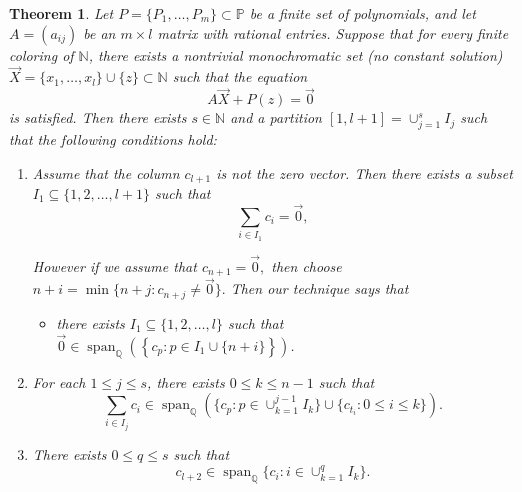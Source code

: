 \documentclass{article}
\theoremstyle{Theorem}
\newtheorem{thm}{Theorem}[section]
\theoremstyle{definition}
\begin{document}
\begin{thm}\label{N2}
Let \( P = \{P_1, \ldots, P_m\} \subset \mathbb{P} \) be a finite set of polynomials, and let \( A = (a_{ij}) \) be an \( m \times l \) matrix with rational entries. Suppose that for every finite coloring of \( \mathbb{N} \), there exists a nontrivial monochromatic set (no constant solution) \( \vec{X} = \{x_1, \ldots, x_l\} \cup \{z\} \subset \mathbb{N} \) such that the equation
\[
A\vec{X} + P(z) = \vec{0}
\]
is satisfied. Then there exists \( s \in \mathbb{N} \) and a partition $[1,l+1]=\cup_{j=1}^{s}I_j$
 such that the following conditions hold:



\begin{enumerate}
\item Assume that the column \( c_{l+1} \) is not the zero vector. Then there exists a subset \( I_1 \subseteq \{1, 2, \ldots, l+1\} \) such that
\[
\sum_{i \in I_1} c_i = \vec{0},
\]




However if we assume that $c_{n+1}=\vec 0,$ then choose $n+i=\min\{n+j:c_{n+j}\neq \vec 0\}.$ Then our technique says that 

\begin{itemize}
    \item[(1')] there exists $I_1\subseteq \{1, 2, \ldots, l\}$ such that \(\vec 0\in \operatorname{span}_{\mathbb{Q}}\left(\left\lbrace c_p:p\in I_1\cup \{{n+i}\}\right\rbrace \right)\).
\end{itemize}

    \item For each \( 1 \leq j \leq s \), there exists \( 0 \leq k \leq n-1 \) such that
    \[
  \sum_{i\in I_j}c_i   \in \operatorname{span}_{\mathbb{Q}} \left( \{ c_p : p \in \cup_{k=1}^{j-1}I_k \} \cup \{ c_{t_i} : 0 \leq i \leq k \} \right).
    \]

    \item There exists \( 0 \leq q \leq s \) such that
    \[
    c_{l+2} \in \operatorname{span}_{\mathbb{Q}} \{ c_i : i \in \cup_{k=1}^{q}I_k \}.
    \]


\end{enumerate}
\end{thm}
\end{document}
